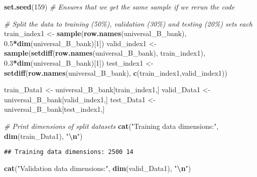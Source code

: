 \documentclass[
]{article}
\newenvironment{Shaded}{\begin{snugshade}}{\end{snugshade}}
\newcommand{\CommentTok}[1]{\textcolor[rgb]{0.56,0.35,0.01}{\textit{#1}}}
\newcommand{\DecValTok}[1]{\textcolor[rgb]{0.00,0.00,0.81}{#1}}
\newcommand{\FloatTok}[1]{\textcolor[rgb]{0.00,0.00,0.81}{#1}}
\newcommand{\FunctionTok}[1]{\textcolor[rgb]{0.13,0.29,0.53}{\textbf{#1}}}
\newcommand{\NormalTok}[1]{#1}
\newcommand{\OtherTok}[1]{\textcolor[rgb]{0.56,0.35,0.01}{#1}}
\newcommand{\SpecialCharTok}[1]{\textcolor[rgb]{0.81,0.36,0.00}{\textbf{#1}}}
\newcommand{\StringTok}[1]{\textcolor[rgb]{0.31,0.60,0.02}{#1}}
\begin{document}
\begin{Shaded}
\begin{Highlighting}[]
\FunctionTok{set.seed}\NormalTok{(}\DecValTok{159}\NormalTok{) }\CommentTok{\# Ensures that we get the same sample if we rerun the code}

\CommentTok{\# Split the data to training (50\%), validation (30\%) and testing (20\%) sets each}
\NormalTok{train\_index1 }\OtherTok{\textless{}{-}} \FunctionTok{sample}\NormalTok{(}\FunctionTok{row.names}\NormalTok{(universal\_B\_bank), }\FloatTok{0.5}\SpecialCharTok{*}\FunctionTok{dim}\NormalTok{(universal\_B\_bank)[}\DecValTok{1}\NormalTok{])}
\NormalTok{valid\_index1 }\OtherTok{\textless{}{-}} \FunctionTok{sample}\NormalTok{(}\FunctionTok{setdiff}\NormalTok{(}\FunctionTok{row.names}\NormalTok{(universal\_B\_bank), train\_index1),}
                       \FloatTok{0.3}\SpecialCharTok{*}\FunctionTok{dim}\NormalTok{(universal\_B\_bank)[}\DecValTok{1}\NormalTok{]) }
\NormalTok{test\_index1 }\OtherTok{\textless{}{-}} \FunctionTok{setdiff}\NormalTok{(}\FunctionTok{row.names}\NormalTok{(universal\_B\_bank), }\FunctionTok{c}\NormalTok{(train\_index1,valid\_index1))}

\NormalTok{train\_Data1 }\OtherTok{\textless{}{-}}\NormalTok{ universal\_B\_bank[train\_index1,]}
\NormalTok{valid\_Data1 }\OtherTok{\textless{}{-}}\NormalTok{ universal\_B\_bank[valid\_index1,]}
\NormalTok{test\_Data1 }\OtherTok{\textless{}{-}}\NormalTok{ universal\_B\_bank[test\_index1,]}

\CommentTok{\# Print dimensions of split datasets}
\FunctionTok{cat}\NormalTok{(}\StringTok{"Training data dimensions:"}\NormalTok{, }\FunctionTok{dim}\NormalTok{(train\_Data1), }\StringTok{"}\SpecialCharTok{\textbackslash{}n}\StringTok{"}\NormalTok{)}
\end{Highlighting}
\end{Shaded}

\begin{verbatim}
## Training data dimensions: 2500 14
\end{verbatim}

\begin{Shaded}
\begin{Highlighting}[]
\FunctionTok{cat}\NormalTok{(}\StringTok{"Validation data dimensions:"}\NormalTok{, }\FunctionTok{dim}\NormalTok{(valid\_Data1), }\StringTok{"}\SpecialCharTok{\textbackslash{}n}\StringTok{"}\NormalTok{)}
\end{Highlighting}
\end{Shaded}
\end{document}
